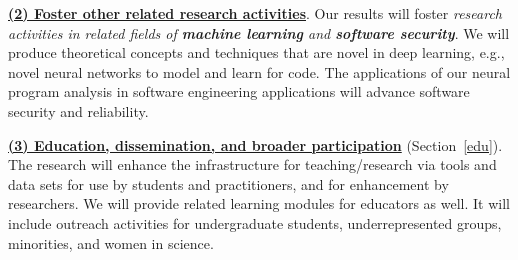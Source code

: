 \noindent\underline{{\bf (2) Foster other related research
    activities}}. Our results will foster {\em research activities in
  related fields of {\bf machine learning} and {\bf software
    security}}. We will produce theoretical concepts and
techniques that are novel in deep learning, e.g., novel neural
networks to model and learn for code. The applications of our neural
program analysis in software engineering applications will advance
software security and reliability.



\noindent\underline{{\bf (3) Education, dissemination, and broader participation}} (Section~\ref{edu}). The
research will enhance the infrastructure for teaching/research via
tools and data sets for use by students and practitioners, and for
enhancement by researchers. We will provide related learning
modules for educators as well. It will include outreach activities for
undergraduate students, underrepresented groups, minorities, and women
in science.



